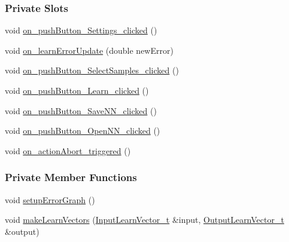 \subsubsection*{Private Slots}
\begin{DoxyCompactItemize}
\item 
void \hyperlink{class_dialog_n_n_a4a203b679f42761eae157b445bcfc57d}{on\+\_\+push\+Button\+\_\+\+Settings\+\_\+clicked} ()
\item 
void \hyperlink{class_dialog_n_n_a24e8d08c95de8dd392e81409b9500ab6}{on\+\_\+learn\+Error\+Update} (double new\+Error)
\item 
void \hyperlink{class_dialog_n_n_a7394140277f980979c9285fa88bee382}{on\+\_\+push\+Button\+\_\+\+Select\+Samples\+\_\+clicked} ()
\item 
void \hyperlink{class_dialog_n_n_ac62a7698eca8514c5629f5ee1e08f3bd}{on\+\_\+push\+Button\+\_\+\+Learn\+\_\+clicked} ()
\item 
void \hyperlink{class_dialog_n_n_aaa6a74ab07099e65b19feceed3dda9f2}{on\+\_\+push\+Button\+\_\+\+Save\+N\+N\+\_\+clicked} ()
\item 
void \hyperlink{class_dialog_n_n_abd4b8adf422cc857506bb3e69066ff02}{on\+\_\+push\+Button\+\_\+\+Open\+N\+N\+\_\+clicked} ()
\item 
void \hyperlink{class_dialog_n_n_ac814ace2a51a7054e0f81a8f3963cd33}{on\+\_\+action\+Abort\+\_\+triggered} ()
\end{DoxyCompactItemize}
\subsubsection*{Private Member Functions}
\begin{DoxyCompactItemize}
\item 
void \hyperlink{class_dialog_n_n_ae3abaadf57d6614cddb1a9c244da721d}{setup\+Error\+Graph} ()
\item 
void \hyperlink{class_dialog_n_n_a832ef2838d6b6fd1e06b6c0d2a4783d4}{make\+Learn\+Vectors} (\hyperlink{_soil_math_types_8h_a45aa81992bf0ddf272907bd4fa0b96cf}{Input\+Learn\+Vector\+\_\+t} \&input, \hyperlink{_soil_math_types_8h_a2d8b5a261688166d724b68addd8561e6}{Output\+Learn\+Vector\+\_\+t} \&output)
\end{DoxyCompactItemize}
